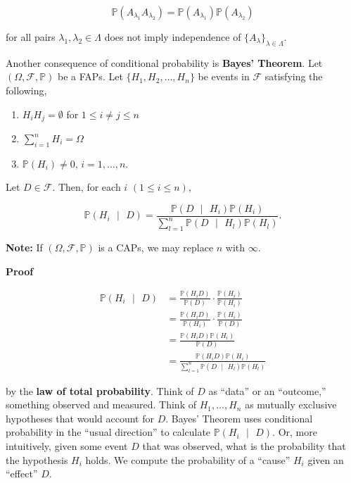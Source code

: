 \documentclass[12pt]{article}
\newcommand{\prob}[1]{\mathbb{P}(#1)}
\newcommand{\condprob}[2]{\mathbb{P}(#1 \text{ } \lvert \text{ } #2)}
\begin{document}
\begin{equation*}
\prob{A_{\lambda_1}A_{\lambda_2}} = \prob{A_{\lambda_1}} \prob{A_{\lambda_2}}
\end{equation*}

\noindent
for all pairs $\lambda_1, \lambda_2 \in \Lambda$ does not imply independence of $\big \{ A_{\lambda} \big \}_{\lambda \in \Lambda}$. 

\vspace*{.5cm}
\noindent
Another consequence of conditional probability is \textbf{Bayes' Theorem}. Let $(\Omega, \mathcal{F}, \mathbb{P})$ be a FAPs. Let $\{ H_1, H_2, \ldots, H_n \}$ be events in $\mathcal{F}$ satisfying the following, 

\begin{enumerate}[label=(\roman*)]
\item $H_i H_j = \emptyset$ for $1 \leq i \neq j \leq n$
\item $\sum_{i=1}^{n} H_i = \Omega$
\item $\prob{H_i} \neq 0$, $i=1, \ldots, n$.
\end{enumerate}

\noindent
Let $D \in \mathcal{F}$. Then, for each $i$ $(1 \leq i \leq n)$,

\begin{equation*}
\condprob{H_i}{D} = \frac{\condprob{D}{H_i} \prob{H_i}}{\sum_{l = 1}^{n} \condprob{D}{H_l} \prob{H_l}}.
\end{equation*}

\noindent
\textbf{Note:} If $(\Omega, \mathcal{F}, \mathbb{P})$ is a CAPs, we may replace $n$ with $\infty$. 

\vspace*{.5cm}
\noindent
\textbf{Proof}

\begin{align*}
\condprob{H_i}{D} & = \frac{\prob{H_i D}}{\prob{D}} \cdot \frac{\prob{H_i}}{\prob{H_i}} \\
& = \frac{\prob{H_i D}}{\prob{H_i}} \cdot \frac{\prob{H_i}}{\prob{D}} \\
& = \frac{\prob{H_i D} \prob{H_i}}{\prob{D}} \\
& = \frac{\prob{H_i D} \prob{H_i}}{ \sum_{l=1}^{n} \condprob{D}{H_l} \prob{H_l} }
\end{align*}

\noindent
by the \textbf{law of total probability}. Think of $D$ as ``data'' or an ``outcome,'' something observed and measured. Think of $H_1, \ldots, H_n$ as mutually exclusive hypotheses that would account for $D$. Bayes' Theorem uses conditional probability in the ``usual direction'' to calculate $\condprob{H_i}{D}$. Or, more intuitively, given some event $D$ that was observed, what is the probability that the hypothesis $H_i$ holds. We compute the probability of a ``cause'' $H_i$ given an ``effect'' $D$.
\end{document}
